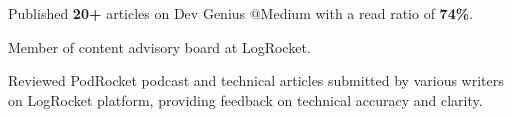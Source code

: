 \documentclass[]{deedy-resume-openfont}
\begin{document}
\begin{minipage}[t]{0.66\textwidth}
\begin{tightemize}
\item Published \textbf{20+} articles on Dev Genius @Medium with a read ratio of \textbf{74\%}.\\
\end{tightemize}
\sectionsep

\vspace{\topsep} %
\begin{tightemize}
\item Member of content advisory board at LogRocket.
\item Reviewed PodRocket podcast and technical articles submitted by various writers on LogRocket platform, providing feedback on technical accuracy and clarity.
\end{tightemize}
\sectionsep


\end{minipage}
\end{document}

